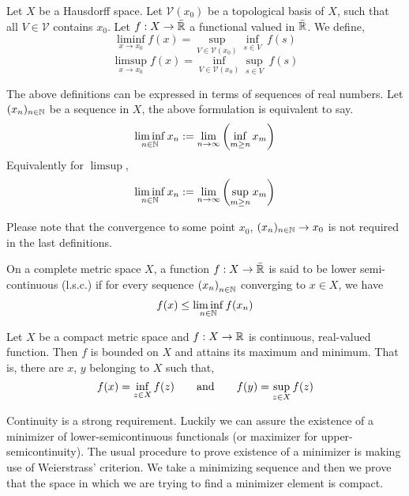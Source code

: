 \begin{definition}
	Let $X$ be a Hausdorff space. Let $\mathcal{V}(x_0)$ be a topological basis of $X$, such that all $V\in \mathcal{V}$ contains $x_0$. Let $f: X\rightarrow \bar{\mathbb{R}}$ a functional valued in $\bar{\mathbb{R}}$. We define, 
	\begin{equation*}
	\liminf_{x\rightarrow x_0} f(x)= \sup_{V\in \mathcal{V}(x_0)} \inf_{s\in V}\ f(s)
	\end{equation*}
	\begin{equation*}
	\limsup_{x\rightarrow x_0} f(x)= \inf_{V\in \mathcal{V}(x_0)} \sup_{s\in V}\ f(s)
	\end{equation*}
	
	The above definitions can be expressed in terms of sequences of real numbers. Let $(x_n)_{n \in \mathbb{N}}$ be a sequence in $X$, the above formulation is equivalent to say.
	\begin{equation*}
	\liminf_{n\in \mathbb{N}} x_n := \lim_{n\rightarrow \infty} \left( \inf_{m\geq n} x_m \right)
	\end{equation*}
	Equivalently for $\limsup$,
	\begin{equation*}
	\liminf_{n\in \mathbb{N}} x_n := \lim_{n\rightarrow \infty} \left( \sup_{m\geq n} x_m \right)
	\end{equation*}
	
	Please note that the convergence to some point $x_0$, $(x_n)_{n\in \mathbb{N}}\rightarrow x_0$ is not required in the last definitions.
\end{definition}

\begin{definition}
	On a complete metric space $X$, a function $f: X\rightarrow\bar{\mathbb{R}}$ is said to be lower semi-continuous (l.s.c.) if for every sequence $\left( x_n \right)_{n\in\mathbb{N}}$ converging to $x\in X$, we have \begin{equation*}
	f(x)\leq \liminf_{n\in \mathbb{N}} f(x_n)
	\end{equation*}
\end{definition}


\begin{theorem}
	Let $X$ be a compact metric space and $f: X\rightarrow \mathbb{R}$ is continuous, real-valued function. Then $f$ is bounded on $X$ and attains its maximum and minimum. That is, there are $x$, $y$ belonging to $X$ such that,
	\begin{equation*}
	f(x)=\inf_{z\in X}f(z) \qquad \mathrm{and} \qquad f(y)=\sup_{z \in X} f(z)
	\end{equation*}
\end{theorem}
Continuity is a strong requirement. Luckily we can assure the existence of a minimizer of lower-semicontinuous functionals (or maximizer for upper-semicontinuity). The usual procedure to prove existence of a minimizer is making use of Weierstrass' criterion. We take a minimizing sequence and then we prove that the space in which we are trying to find a minimizer element is compact.

